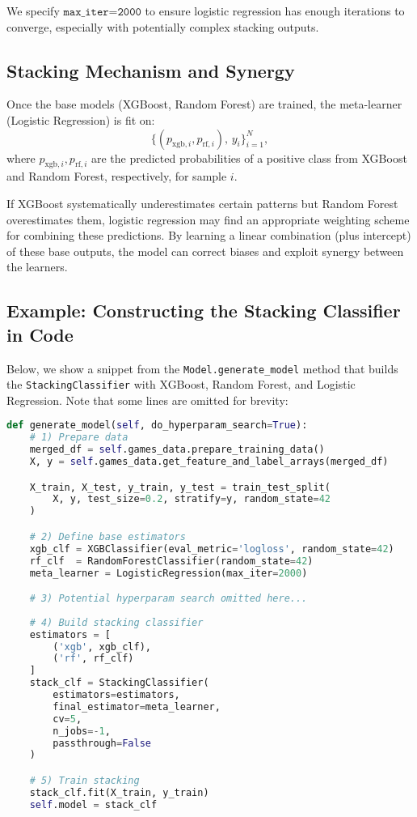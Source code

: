 \documentclass[12pt]{article}
\begin{document}
\noindent We specify \(\texttt{max\_iter=2000}\) to ensure logistic regression has enough iterations to converge, especially with potentially complex stacking outputs.

\subsection{Stacking Mechanism and Synergy}
Once the base models (XGBoost, Random Forest) are trained, the meta-learner (Logistic Regression) is fit on:
\[
\big\{ (p_{\text{xgb},i}, p_{\text{rf},i}),\, y_i \big\}_{i=1}^N,
\]
where \(p_{\text{xgb},i}, p_{\text{rf},i}\) are the predicted probabilities of a positive class from XGBoost and Random Forest, respectively, for sample \(i\).

If XGBoost systematically underestimates certain patterns but Random Forest overestimates them, logistic regression may find an appropriate weighting scheme for combining these predictions. By learning a linear combination (plus intercept) of these base outputs, the model can correct biases and exploit synergy between the learners.

\subsection{Example: Constructing the Stacking Classifier in Code}
Below, we show a snippet from the \texttt{Model.generate\_model} method that builds the \texttt{StackingClassifier} with XGBoost, Random Forest, and Logistic Regression. Note that some lines are omitted for brevity:

\begin{lstlisting}[language=Python]
def generate_model(self, do_hyperparam_search=True):
    # 1) Prepare data
    merged_df = self.games_data.prepare_training_data()
    X, y = self.games_data.get_feature_and_label_arrays(merged_df)

    X_train, X_test, y_train, y_test = train_test_split(
        X, y, test_size=0.2, stratify=y, random_state=42
    )

    # 2) Define base estimators
    xgb_clf = XGBClassifier(eval_metric='logloss', random_state=42)
    rf_clf  = RandomForestClassifier(random_state=42)
    meta_learner = LogisticRegression(max_iter=2000)

    # 3) Potential hyperparam search omitted here...
    
    # 4) Build stacking classifier
    estimators = [
        ('xgb', xgb_clf),
        ('rf', rf_clf)
    ]
    stack_clf = StackingClassifier(
        estimators=estimators,
        final_estimator=meta_learner,
        cv=5,
        n_jobs=-1,
        passthrough=False
    )

    # 5) Train stacking
    stack_clf.fit(X_train, y_train)
    self.model = stack_clf
\end{lstlisting}
\end{document}
